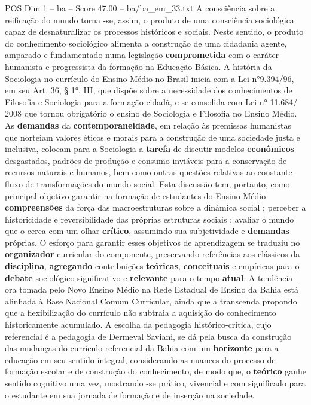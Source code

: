 \begin{textsample}{POS Dim 1 – ba – Score 47.00 – ba/ba\_em\_33.txt}
A consciência sobre a reificação do mundo torna -se, assim, o produto de uma consciência sociológica capaz de desnaturalizar os processos históricos e sociais.
Neste sentido, o produto do conhecimento sociológico alimenta a construção de uma cidadania agente, amparado e fundamentado numa legislação \textbf{comprometida} com o caráter humanista e progressista da formação na Educação Básica.
A história da Sociologia no currículo do Ensino Médio no Brasil inicia com a Lei n{\EmojiFont °}9.394/96, em seu Art. 36, § 1{\EmojiFont °}, III, que dispõe sobre a necessidade dos conhecimentos de Filosofia e Sociologia para a formação cidadã, e se consolida com Lei n{\EmojiFont °} 11.684/ 2008 que tornou obrigatório o ensino de Sociologia e Filosofia no Ensino Médio.
As \textbf{demandas} da \textbf{contemporaneidade}, em relação às premissas humanistas que norteiam valores éticos e morais para a construção de uma sociedade justa e inclusiva, colocam para a Sociologia a \textbf{tarefa} de discutir modelos \textbf{econômicos} desgastados, padrões de produção e consumo inviáveis para a conservação de recursos naturais e humanos, bem como outras questões relativas ao constante fluxo de transformações do mundo social.
Esta discussão tem, portanto, como principal objetivo garantir na formação de estudantes do Ensino Médio \textbf{compreensões} da força das macroestruturas sobre a dinâmica social ; perceber a historicidade e reversibilidade das próprias estruturas sociais ; avaliar o mundo que o cerca com um olhar \textbf{crítico}, assumindo sua subjetividade e \textbf{demandas} próprias.
O esforço para garantir esses objetivos de aprendizagem se traduziu no \textbf{organizador} curricular do componente, preservando referências aos clássicos da \textbf{disciplina}, \textbf{agregando} contribuições \textbf{teóricas}, \textbf{conceituais} e empíricas para o \textbf{debate} sociológico significativo e \textbf{relevante} para o tempo \textbf{atual}.
A tendência ora tomada pelo Novo Ensino Médio na Rede Estadual de Ensino da Bahia está alinhada à Base Nacional Comum Curricular, ainda que a transcenda propondo que a flexibilização do currículo não subtraia a aquisição do conhecimento historicamente acumulado.
A escolha da pedagogia histórico-crítica, cujo referencial é a pedagogia de Dermeval Saviani, se dá pela busca da construção das mudanças do currículo referencial da Bahia com um \textbf{horizonte} para a educação em seu sentido integral, considerando as nuances do processo de formação escolar e de construção do conhecimento, de modo que, o \textbf{teórico} ganhe sentido cognitivo uma vez, mostrando -se prático, vivencial e com significado para o estudante em sua jornada de formação e de inserção na sociedade.

\end{textsample}
